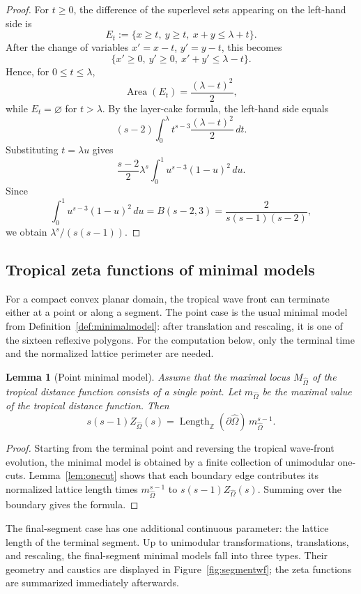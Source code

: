 \documentclass[a4paper,american,11pt]{amsart}
\theoremstyle{plain}
\newtheorem{lemma}[theorem]{Lemma}
\theoremstyle{definition}
\newcommand{\Z}{\mathbb Z}
\DeclareMathOperator{\Area}{Area}
\DeclareMathOperator{\Length}{Length}
\begin{document}
\begin{proof}
For \(t\ge0\), the difference of the superlevel sets appearing on the
left-hand side is
\[
E_t:=\{x\ge t,\ y\ge t,\ x+y\le \lambda+t\}.
\]
After the change of variables \(x'=x-t\), \(y'=y-t\), this becomes
\[
\{x'\ge0,\ y'\ge0,\ x'+y'\le \lambda-t\}.
\]
Hence, for \(0\le t\le\lambda\),
\[
\Area(E_t)=\frac{(\lambda-t)^2}{2},
\]
while \(E_t=\varnothing\) for \(t>\lambda\). By the layer-cake formula, the
left-hand side equals
\[
(s-2)\int_0^\lambda t^{s-3}\frac{(\lambda-t)^2}{2}\,dt.
\]
Substituting \(t=\lambda u\) gives
\[
\frac{s-2}{2}\lambda^s\int_0^1u^{s-3}(1-u)^2\,du.
\]
Since
\[
\int_0^1u^{s-3}(1-u)^2\,du
=
B(s-2,3)
=
\frac{2}{s(s-1)(s-2)},
\]
we obtain \(\lambda^s/(s(s-1))\).
\end{proof}

\subsection{Tropical zeta functions of minimal models}\label{ss:tropmmzeta}

For a compact convex planar domain, the tropical wave front can terminate
either at a point or along a segment. The point case is the usual minimal
model from Definition~\ref{def:minimalmodel}: after translation and
rescaling, it is one of the sixteen reflexive polygons. For the computation
below, only the terminal time and the normalized lattice perimeter are needed.

\begin{lemma}[Point minimal model]\label{lem:point-minimal-model-zeta}
Assume that the maximal locus \(M_{\widehat\Omega}\) of the tropical distance
function consists of a single point. Let \(m_{\widehat\Omega}\) be the maximal
value of the tropical distance function. Then
\[
s(s-1)Z_{\widehat\Omega}(s)
=
\Length_{\Z}(\partial\widehat\Omega)\,
m_{\widehat\Omega}^{s-1}.
\]
\end{lemma}

\begin{proof}
Starting from the terminal point and reversing the tropical wave-front
evolution, the minimal model is obtained by a finite collection of unimodular
one-cuts. Lemma~\ref{lem:onecut} shows that each boundary edge contributes
its normalized lattice length times \(m_{\widehat\Omega}^{s-1}\) to
\(s(s-1)Z_{\widehat\Omega}(s)\). Summing over the boundary gives the formula.
\end{proof}

The final-segment case has one additional continuous parameter: the lattice
length of the terminal segment. Up to unimodular transformations,
translations, and rescaling, the final-segment minimal models fall into three
types. Their geometry and caustics are displayed in
Figure~\ref{fig:segmentwf}; the zeta functions are summarized immediately
afterwards.
\end{document}
